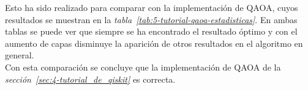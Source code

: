 Esto ha sido realizado para comparar con la implementación de QAOA, cuyos resultados se muestran en la \textit{tabla~\ref{tab:5-tutorial-qaoa-estadisticas}}.
En ambas tablas se puede ver que siempre se ha encontrado el resultado óptimo y con el aumento de capas disminuye la aparición de otros resultados en el algoritmo en general.
\\
Con esta comparación se concluye que la implementación de QAOA de la \textit{sección~\ref{sec:4-tutorial_de_qiskit}} es correcta.


